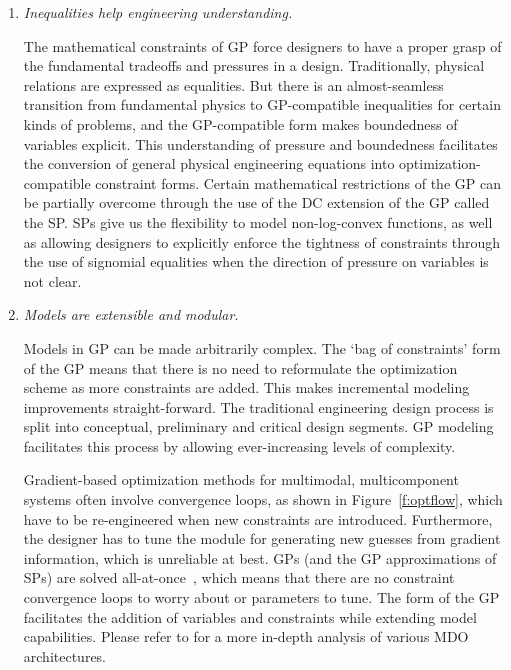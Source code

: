 \begin{enumerate}

    \item \textit{Inequalities help engineering understanding.}

    The mathematical constraints of \gls{GP} force designers to have a proper grasp
    of the fundamental tradeoffs and pressures in a design.
    Traditionally, physical relations are expressed as equalities. But there is an
    almost-seamless transition from fundamental physics to GP-compatible
    inequalities for certain kinds of problems, and the \gls{GP}-compatible
    form makes boundedness of variables explicit. This understanding of pressure
    and boundedness facilitates the conversion of general physical engineering
    equations into optimization-compatible constraint forms.
    Certain mathematical restrictions of the \gls{GP} can be partially
    overcome through the use of the \gls{DC}
    extension of the \gls{GP} called the \gls{SP}. \gls{SP}s give us the flexibility to model
    non-log-convex functions, as well as allowing designers to explicitly enforce
    the tightness of
    constraints through the use of signomial equalities when the direction of pressure
    on variables is not clear.

    \item \textit{Models are extensible and modular.}

    Models in \gls{GP} can be made arbitrarily complex.
    The `bag of constraints' form of the \gls{GP}
    means that there is no need to reformulate the optimization scheme as more
    constraints are added. This makes incremental modeling improvements straight-forward.
    The traditional engineering design process is split into conceptual, preliminary
    and critical design segments. \gls{GP} modeling facilitates this process by allowing
    ever-increasing levels of complexity.

    Gradient-based optimization methods for
    multimodal, multicomponent systems often involve
    convergence loops, as shown in Figure~\ref{f:optflow}, which have to be re-engineered
    when new constraints are introduced. Furthermore, the designer has to tune
    the module for generating new guesses from gradient information, which is unreliable
    at best. \gls{GP}s (and the \gls{GP} approximations
    of \gls{SP}s) are solved all-at-once~\cite{martins_mdo}, which means that there are no constraint
    convergence loops to worry about or parameters to tune. The
    form of the GP facilitates the addition of variables and constraints while extending
    model capabilities. Please refer to \cite{martins_mdo}
    for a more in-depth analysis of various \gls{MDO} architectures.


\end{enumerate}
